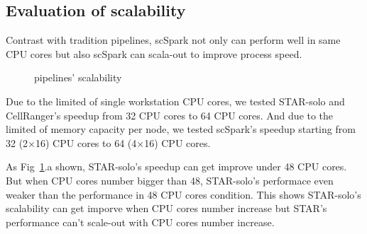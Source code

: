 \documentclass[conference]{IEEEtran}
\begin{document}
\subsection{Evaluation of scalability} 
Contrast with tradition pipelines, scSpark not only can perform well in same CPU cores but also scSpark can scala-out to improve process speed.
\begin{figure}
	\centering
	\caption{ pipelines' scalability }
	\label{fig3}
\end{figure}

Due to the limited of single workstation CPU cores, we tested STAR-solo and CellRanger's speedup from 32 CPU cores to 64 CPU cores.
And due to the limited of memory capacity per node, we tested scSpark's speedup starting from 32 (2$\times$16) CPU cores to 64 (4$\times$16) CPU cores.

As Fig~\ref{fig3}.a shown, STAR-solo's speedup can get improve under 48 CPU cores.
But when CPU cores number bigger than 48, STAR-solo's performace even weaker than the performance in 48 CPU cores condition.
This shows STAR-solo's scalability can get imporve when CPU cores number increase but STAR's performance can't scale-out with CPU cores number increase.
\end{document}
